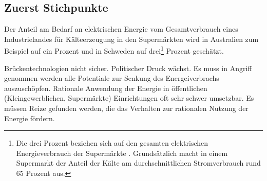 \subsection*{Zuerst Stichpunkte}

Der Anteil am Bedarf an elektrischen Energie vom Gesamtverbrauch eines Industrielandes für Kälteerzeugung in den Supermärkten
wird in Australien zum Beispiel auf ein Prozent \cite[Seite 8]{australia} und in Schweden auf drei\footnote{ Die drei Prozent
beziehen sich auf den gesamten elektrischen Energieverbrauch der Supermärkte \cite[Seite 6]{doctor}. Grundsätzlich macht in
einem Supermarkt der Anteil der Kälte am durchschnittlichen Stromverbrauch rund 65 Prozent aus.\cite{EANRW}} Prozent
geschätzt.

Brückentechnologien nicht sicher. Politischer Druck wächst. Es muss in Angriff genommen werden alle Potentiale zur Senkung
des Energeiverbrachs auszuschöpfen.  Rationale Anwendung der Energie in öffentlichen (Kleingewerblichen, Supermärkte)
Einrichtungen oft sehr schwer umsetzbar. Es müssen Reize gefunden werden, die das Verhalten zur rationalen Nutzung der
Energie fördern.


